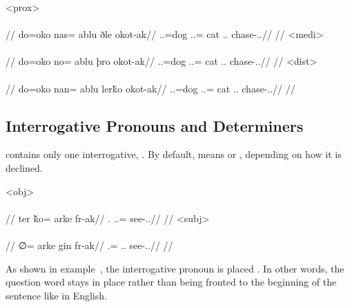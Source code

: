 	\a<prox>\begingl
		\glpreamble{}\\
		\\
		//
		\gla do=oko nas= ablu ðle okot-ak//
		\glb \An.\Sg.\Erg=dog \An.\Pc.\Top= cat \Dem.\Det.\Prox{} chase-\Ind.\Pst.\Pfv//
		\glft{}//
	\endgl
	\a<medi>\begingl
		\glpreamble{}\\
		\\
		//
		\gla do=oko no= ablu þro okot-ak//
		\glb \An.\Sg.\Erg=dog \An.\Sg.\Top= cat \Dem.\Det.\Med{} chase-\Ind.\Pst.\Pfv//
		\glft{}//
	\endgl
	\a<dist>\begingl
		\glpreamble{}\\
		\\
		//
		\gla do=oko nan= ablu lerǩo okot-ak//
		\glb \An.\Sg.\Erg=dog \An.\Pl.\Top= cat \Dem.\Det.\Dist{} chase-\Ind.\Pst.\Pfv//
		\glft{}//
	\endgl
\xe

\subsection{Interrogative Pronouns and Determiners}
\label{subsec:tvk-interrogative-pronouns-determiners}

\langtvk{} contains only one interrogative,   . By default,   means  or , depending on how it is declined.

	\a<obj>\begingl
		\glpreamble{}\\
		\\
		//
		\gla ter ǩo= arke fr-ak//
		\glb \Sps.\Abs{} \In.\Sg.\Dat= \Int{} see-\Ind.\Pst.\Pfv//
		\glft{}//
	\endgl
	\a<subj>\begingl
		\glpreamble{}\\
		\\
		//
		\gla ∅= arke gin fr-ak//
		\glb \Sg.\Abs= \Int{} \Tps.\In.\Top{} see-\Ind.\Pst.\Pfv//
		\glft{}//
	\endgl
\xe

As shown in example~, the interrogative pronoun is placed  . In other words, the question word stays in place rather than being fronted to the beginning of the sentence like in English.

